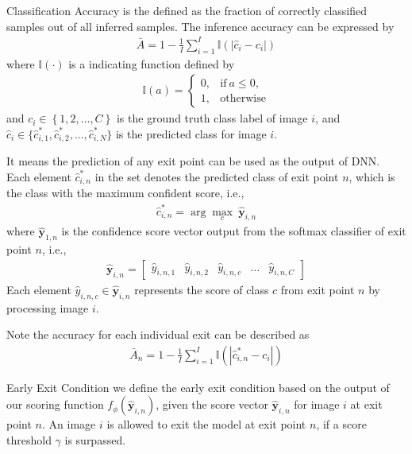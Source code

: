\begin{enumdescript}
		\item[Classification Accuracy] is the defined as the fraction of correctly classified samples out of all inferred samples. The inference accuracy can be expressed by
		\begin{align}
		\bar{A}=1-\frac{1}{I} \sum_{i=1}^{I} \mathbb{I}\left(\left|\hat{c}_{i}-c_{i}\right|\right) \label{eq:accuracy}
		\end{align}
		where $ \mathbb{I(\cdot)}  $ is a indicating function defined by
		\begin{align}
		\mathbb{I}(a)= \begin{cases}
		0, & \mathrm{if\:} a \leq 0, \\
		1, & \mathrm{otherwise}
		\end{cases} \label{eq:indicator}
		\end{align}
		and $ c_i \in \left\{1, 2, \dots, C \right\} $ is the ground truth class label of image $ i $, and $  \hat{c}_i \in \{\hat{c}^*_{i,1} , \hat{c}^*_{i,2}, \dots, \hat{c}^*_{i,N} \} $ is the predicted class for image $ i $. 
		
		It means the prediction of any exit point can be used as the output of DNN. Each element $ \hat{c}^*_{i,n} $ in the set denotes the predicted class of exit point $ n $, which is the class with the maximum confident score, i.e.,
		\begin{align}
		\hat{c}^*_{i,n} = \arg \underset{c}{\max}\: \bm{\hat{y}}_{i,n}
		\end{align}
		where $ \bm{\hat{y}}_{1,n} $ is the confidence score vector output from the softmax classifier of exit point $ n $, i.e.,
		\begin{align}
		\bm{\hat{y}}_{i,n} = \left[\begin{array}{ccccc}\hat{y}_{i,n,1} & \hat{y}_{i,n,2} & \hat{y}_{i,n,c} & \dots & \hat{y}_{i,n,C}\end{array}\right]
		\end{align}
		Each element $ \hat{y}_{i,n,c} \in \bm{\hat{y}}_{i,n} $ represents the score of class $ c $ from exit point $ n $ by processing image $ i $.
		
		Note the accuracy for each individual exit can be described as
		\begin{align}
		\bar{A}_n=1-\frac{1}{I} \sum_{i=1}^{I} \mathbb{I}\left(\left|\hat{c}^*_{i,n}-c_{i}\right|\right)
		\end{align}
  
		\item[Early Exit Condition] we define the early exit condition based on the output of our scoring function $ f_\phi(\bm{\hat{y}}_{i,n}) $, given the score vector $ \bm{\hat{y}}_{i,n} $ for image $ i $ at exit point $ n $. An image $ i $ is allowed to exit the model at exit point $ n $, if a score threshold $ \gamma $ is surpassed. 
		

\end{enumdescript}
